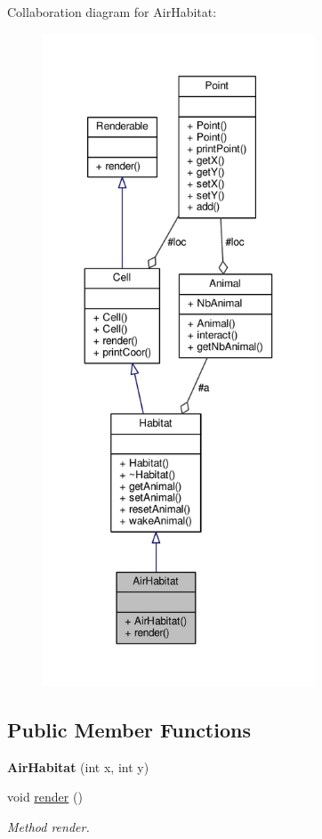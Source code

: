 Collaboration diagram for Air\+Habitat\+:
\nopagebreak
\begin{figure}[H]
\begin{center}
\leavevmode
\includegraphics[height=550pt]{classAirHabitat__coll__graph}
\end{center}
\end{figure}
\subsection*{Public Member Functions}
\begin{DoxyCompactItemize}
\item 
{\bfseries Air\+Habitat} (int x, int y)\hypertarget{classAirHabitat_ab17317e1cca06d76389eb65b084bf37b}{}\label{classAirHabitat_ab17317e1cca06d76389eb65b084bf37b}

\item 
void \hyperlink{classAirHabitat_a27885c3ce4486a50629bf1e53cc34905}{render} ()\hypertarget{classAirHabitat_a27885c3ce4486a50629bf1e53cc34905}{}\label{classAirHabitat_a27885c3ce4486a50629bf1e53cc34905}

\begin{DoxyCompactList}\small\item\em Method render. \end{DoxyCompactList}\end{DoxyCompactItemize}
